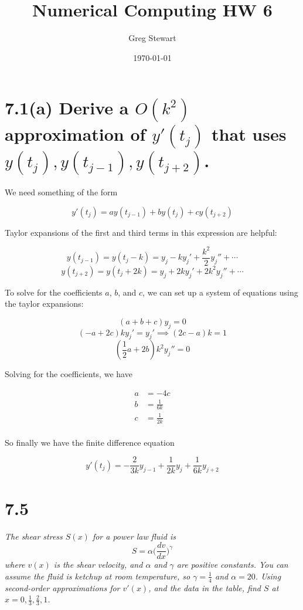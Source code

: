 \documentclass{article}
\title{Numerical Computing HW 6}
\author{Greg Stewart}
\date{\today}
\begin{document}
\maketitle

\section*{7.1(a)  \normalsize Derive a $O(k^2)$ approximation of $y'(t_j)$ that uses $y(t_j), y(t_{j-1}), y(t_{j+2})$.}

We need something of the form

$$y'(t_j) = ay(t_{j-1}) + by(t_j) + cy(t_{j+2})$$

Taylor expansions of the first and third terms in this expression are helpful:

$$y(t_{j-1}) = y(t_j-k) = y_j -ky_j' + \frac{k^2}{2}y_j'' + \cdots$$
$$y(t_{j+2}) = y(t_j+2k) = y_j + 2ky_j' + 2k^2y_j'' + \cdots$$

To solve for the coefficients $a$, $b$, and $c$, we can set up a system of equations using the taylor expansions:

$$(a + b + c)y_j = 0$$
$$(-a + 2c)ky_j' = y_j' \implies (2c - a)k = 1$$
$$(\frac{1}{2}a + 2b)k^2y_j'' = 0$$

Solving for the coefficients, we have

\begin{align*}
  a &= -4c \\
  b &= \frac{1}{6k} \\
  c &= \frac{1}{2k} \\
\end{align*}

So finally we have the finite difference equation

$$y'(t_j) = -\frac{2}{3k}y_{j-1} + \frac{1}{2k}y_j + \frac{1}{6k}y_{j+2}$$ 




\section*{7.5  \normalsize}

\textit{The shear stress $S(x)$ for a power law fluid is $$S=\alpha\Big(\frac{dv}{dx}\Big)^{\gamma}$$ where $v(x)$ is the shear velocity, and $\alpha$ and $\gamma$ are positive constants. You can assume the fluid is ketchup at room temperature, so $\gamma = \frac{1}{4}$ and $\alpha = 20$. Using second-order approximations for $v'(x)$, and the data in the table, find $S$ at $x = 0, \frac{1}{3}, \frac{2}{3}, 1$.}
\end{document}
